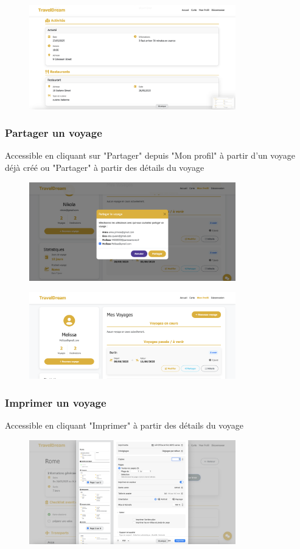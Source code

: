 \documentclass[a4paper,12pt]{article}
\begin{document}
\begin{figure}[H]
    \centering
    \includegraphics[width=0.8\textwidth]{9_detail_voyage_4.png}
\end{figure}


\subsubsection{Partager un voyage}
Accessible en cliquant sur "Partager" depuis "Mon profil" à partir d'un voyage déjà créé ou "Partager" à partir des détails du voyage
\begin{figure}[H]
    \centering
    \includegraphics[width=0.8\textwidth]{10_partager_voyage_1.png}
\end{figure}
\begin{figure}[H]
    \centering
    \includegraphics[width=0.8\textwidth]{10_partager_voyage_2.png}
\end{figure}

\subsubsection{Imprimer un voyage}
Accessible en cliquant "Imprimer" à partir des détails du voyage
\begin{figure}[H]
    \centering
    \includegraphics[width=0.8\textwidth]{11_imprimer_voyage.png}
\end{figure}
\end{document}
